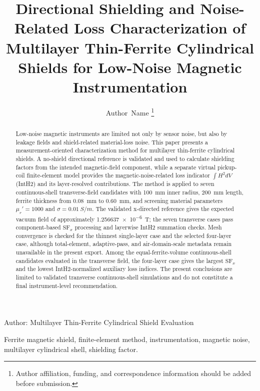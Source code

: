 \documentclass[letterpaper,journal]{IEEEtran}
\begin{document}
\title{Directional Shielding and Noise-Related Loss Characterization of Multilayer Thin-Ferrite Cylindrical Shields for Low-Noise Magnetic Instrumentation}

\author{Author~Name%
\thanks{Author affiliation, funding, and correspondence information should be added before submission.}
}

%
{Author: Multilayer Thin-Ferrite Cylindrical Shield Evaluation}

\maketitle

\begin{abstract}
Low-noise magnetic instruments are limited not only by sensor noise, but also by leakage fields and shield-related material-loss noise. This paper presents a measurement-oriented characterization method for multilayer thin-ferrite cylindrical shields. A no-shield directional reference is validated and used to calculate shielding factors from the intended magnetic-field component, while a separate virtual pickup-coil finite-element model provides the magnetic-noise-related loss indicator $\int H^2dV$ (IntH2) and its layer-resolved contributions. The method is applied to seven continuous-shell transverse-field candidates with \SI{100}{mm} inner radius, \SI{200}{mm} length, ferrite thickness from \SI{0.08}{mm} to \SI{0.60}{mm}, and screening material parameters $\mu_r'=1000$ and $\sigma=\SI{0.01}{S/m}$. The validated x-directed reference gives the expected vacuum field of approximately \SI{1.256637e-6}{T}; the seven transverse cases pass component-based $\mathrm{SF}_x$ processing and layerwise IntH2 summation checks. Mesh convergence is checked for the thinnest single-layer case and the selected four-layer case, although total-element, adaptive-pass, and air-domain-scale metadata remain unavailable in the present export. Among the equal-ferrite-volume continuous-shell candidates evaluated in the transverse field, the four-layer case gives the largest $\mathrm{SF}_x$ and the lowest IntH2-normalized auxiliary loss indices. The present conclusions are limited to validated transverse continuous-shell simulations and do not constitute a final instrument-level recommendation.
\end{abstract}

\begin{IEEEkeywords}
Ferrite magnetic shield, finite-element method, instrumentation, magnetic noise, multilayer cylindrical shell, shielding factor.
\end{IEEEkeywords}
\end{document}
